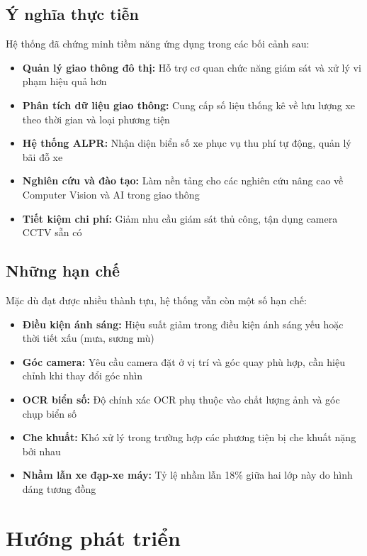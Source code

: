 \subsection{Ý nghĩa thực tiễn}

Hệ thống đã chứng minh tiềm năng ứng dụng trong các bối cảnh sau:

\begin{itemize}
    \item \textbf{Quản lý giao thông đô thị:} Hỗ trợ cơ quan chức năng giám sát và xử lý vi phạm hiệu quả hơn
    \item \textbf{Phân tích dữ liệu giao thông:} Cung cấp số liệu thống kê về lưu lượng xe theo thời gian và loại phương tiện
    \item \textbf{Hệ thống ALPR:} Nhận diện biển số xe phục vụ thu phí tự động, quản lý bãi đỗ xe
    \item \textbf{Nghiên cứu và đào tạo:} Làm nền tảng cho các nghiên cứu nâng cao về Computer Vision và AI trong giao thông
    \item \textbf{Tiết kiệm chi phí:} Giảm nhu cầu giám sát thủ công, tận dụng camera CCTV sẵn có
\end{itemize}

\subsection{Những hạn chế}

Mặc dù đạt được nhiều thành tựu, hệ thống vẫn còn một số hạn chế:

\begin{itemize}
    \item \textbf{Điều kiện ánh sáng:} Hiệu suất giảm trong điều kiện ánh sáng yếu hoặc thời tiết xấu (mưa, sương mù)
    \item \textbf{Góc camera:} Yêu cầu camera đặt ở vị trí và góc quay phù hợp, cần hiệu chỉnh khi thay đổi góc nhìn
    \item \textbf{OCR biển số:} Độ chính xác OCR phụ thuộc vào chất lượng ảnh và góc chụp biển số
    \item \textbf{Che khuất:} Khó xử lý trong trường hợp các phương tiện bị che khuất nặng bởi nhau
    \item \textbf{Nhầm lẫn xe đạp-xe máy:} Tỷ lệ nhầm lẫn 18\% giữa hai lớp này do hình dáng tương đồng
\end{itemize}

\section{Hướng phát triển}

